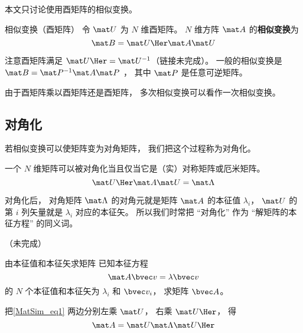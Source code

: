 
本文只讨论使用酉矩阵的相似变换。

\begin{definition}{相似变换（酉矩阵）}\label{MatSim_def1}
令 $\mat U$ 为 $N$ 维酉矩阵。 $N$ 维方阵 $\mat A$ 的\textbf{相似变换}为
\begin{equation}
\mat B = \mat U\Her \mat A \mat U
\end{equation}
\end{definition}

注意酉矩阵满足 $\mat U\Her = \mat U^{-1}$（链接未完成）。 一般的相似变换是 $\mat B = \mat P^{-1} \mat A \mat P$ ， 其中 $\mat P$ 是任意可逆矩阵。

由于酉矩阵乘以酉矩阵还是酉矩阵， 多次相似变换可以看作一次相似变换。

\subsection{对角化}
若相似变换可以使矩阵变为对角矩阵， 我们把这个过程称为对角化。

一个 $N$ 维矩阵可以被对角化当且仅当它是（实）对称矩阵或厄米矩阵。
\begin{equation}\label{MatSim_eq1}
\mat U\Her \mat A \mat U = \mat \Lambda
\end{equation}

对角化后， 对角矩阵 $\mat \Lambda$ 的对角元就是矩阵 $\mat A$ 的本征值 $\lambda_i$， $\mat U$ 的第 $i$ 列矢量就是 $\lambda_i$ 对应的本征矢。 所以我们时常把 “对角化” 作为 “解矩阵的本征方程” 的同义词。

（未完成）

\begin{example}{由本征值和本征矢求矩阵}
已知本征方程
\begin{equation}
\mat A \bvec v = \lambda \bvec v
\end{equation}
的 $N$ 个本征值和本征矢为 $\lambda_i$ 和 $\bvec v_i$， 求矩阵 $\bvec A$。

把\autoref{MatSim_eq1} 两边分别左乘 $\mat U$， 右乘 $\mat U\Her$， 得
\begin{equation}
\mat A = \mat U \mat \Lambda \mat U\Her
\end{equation}
\end{example}

